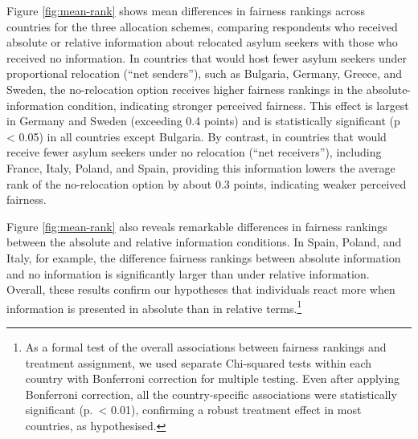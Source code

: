 \documentclass[
  12pt,
  a4paper,
]{article}
\begin{document}
Figure \ref{fig:mean-rank} shows mean differences in fairness rankings across countries for the three allocation schemes, comparing respondents who received absolute or relative information about relocated asylum seekers with those who received no information. In countries that would host fewer asylum seekers under proportional relocation (``net senders''), such as Bulgaria, Germany, Greece, and Sweden, the no-relocation option receives higher fairness rankings in the absolute-information condition, indicating stronger perceived fairness. This effect is largest in Germany and Sweden (exceeding 0.4 points) and is statistically significant (p \textless{} 0.05) in all countries except Bulgaria. By contrast, in countries that would receive fewer asylum seekers under no relocation (``net receivers''), including France, Italy, Poland, and Spain, providing this information lowers the average rank of the no-relocation option by about 0.3 points, indicating weaker perceived fairness.

Figure \ref{fig:mean-rank} also reveals remarkable differences in fairness rankings between the absolute and relative information conditions. In Spain, Poland, and Italy, for example, the difference fairness rankings between absolute information and no information is significantly larger than under relative information. Overall, these results confirm our hypotheses that individuals react more when information is presented in absolute than in relative terms.\footnote{As a formal test of the overall associations between fairness rankings and treatment assignment, we used separate Chi-squared tests within each country with Bonferroni correction for multiple testing. Even after applying Bonferroni correction, all the country-specific associations were statistically significant (p.~\textless{} 0.01), confirming a robust treatment effect in most countries, as hypothesised.}
\end{document}
